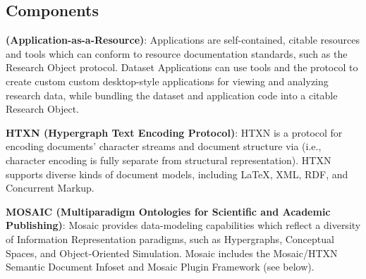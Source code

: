 \atsp
\begin{frame}{}
\section{Components}

\vspace{-3pt}
{\thrulex}

{\fontsize{17}{22}\selectfont
\hspace*{13pt}\begin{minipage}{.97\textwidth}
\vspace{-6pt}



		

{\setlength{\leftmargini}{3pt}\begin{enumerate}
\dmitem \textbf{\AtR{} (Application-as-a-Resource)}: \hspace{.25em} 
\AtR{} Applications are self-contained, citable resources and tools which 
can conform to  resource documentation standards, such as the Research Object protocol.  Dataset Applications can use \AtR{} tools 
and the \AtR{} protocol to create custom custom desktop-style applications 
for viewing and analyzing research data, while bundling the dataset  and application code into a citable Research Object. 
\vspace{11pt}

\dmitem \textbf{HTXN (Hypergraph Text Encoding Protocol)}:  \hspace{.25em}
HTXN is a protocol for encoding documents' character streams  
and document structure via  (i.e.,  
character encoding is fully separate from structural representation).  
HTXN supports diverse kinds of document models, including 
\LaTeX{}, XML, RDF, and Concurrent Markup. 

\dmitem \textbf{MOSAIC (Multiparadigm Ontologies 
	for Scientific and Academic Publishing)}: \hspace{.25em} 
Mosaic provides data-modeling capabilities which 
reflect a diversity of Information Representation 
paradigms, such as Hypergraphs, Conceptual Spaces, 
and Object-Oriented Simulation.  Mosaic includes 
the Mosaic/HTXN Semantic Document Infoset and 
Mosaic Plugin Framework (see below).
\vspace{11pt}  


\end{enumerate}}
\end{minipage}}
\end{frame}
